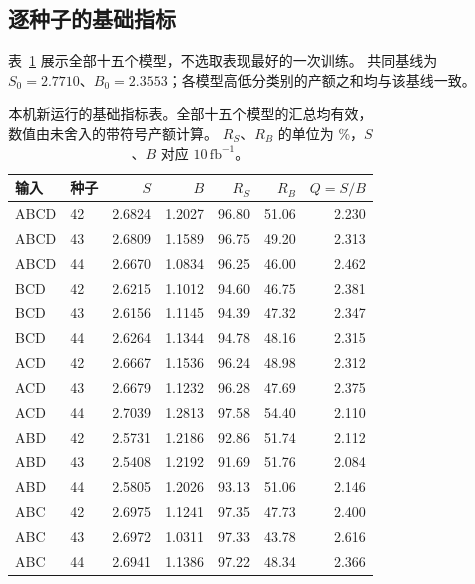 \documentclass[11pt,a4paper,fontset=fandol,scheme=plain]{ctexart}
\begin{document}
\subsection{逐种子的基础指标}
表~\ref{tab:basic-all} 展示全部十五个模型，不选取表现最好的一次训练。
共同基线为 $S_0=2.7710$、$B_0=2.3553$；各模型高低分类别的产额之和均与该基线一致。
\begin{table}[H]
\caption{本机新运行的基础指标表。全部十五个模型的汇总均有效，数值由未舍入的带符号产额计算。
$R_S$、$R_B$ 的单位为 \%，$S$、$B$ 对应 $10\,\mathrm{fb}^{-1}$。}
\label{tab:basic-all}
\centering\small
\begin{tabular}{llrrrrr}
\toprule
输入 & 种子 & $S$ & $B$ & $R_S$ & $R_B$ & $Q=S/B$ \\
\midrule
ABCD & 42 & 2.6824 & 1.2027 & 96.80 & 51.06 & 2.230 \\
ABCD & 43 & 2.6809 & 1.1589 & 96.75 & 49.20 & 2.313 \\
ABCD & 44 & 2.6670 & 1.0834 & 96.25 & 46.00 & 2.462 \\
\addlinespace
BCD & 42 & 2.6215 & 1.1012 & 94.60 & 46.75 & 2.381 \\
BCD & 43 & 2.6156 & 1.1145 & 94.39 & 47.32 & 2.347 \\
BCD & 44 & 2.6264 & 1.1344 & 94.78 & 48.16 & 2.315 \\
\addlinespace
ACD & 42 & 2.6667 & 1.1536 & 96.24 & 48.98 & 2.312 \\
ACD & 43 & 2.6679 & 1.1232 & 96.28 & 47.69 & 2.375 \\
ACD & 44 & 2.7039 & 1.2813 & 97.58 & 54.40 & 2.110 \\
\addlinespace
ABD & 42 & 2.5731 & 1.2186 & 92.86 & 51.74 & 2.112 \\
ABD & 43 & 2.5408 & 1.2192 & 91.69 & 51.76 & 2.084 \\
ABD & 44 & 2.5805 & 1.2026 & 93.13 & 51.06 & 2.146 \\
\addlinespace
ABC & 42 & 2.6975 & 1.1241 & 97.35 & 47.73 & 2.400 \\
ABC & 43 & 2.6972 & 1.0311 & 97.33 & 43.78 & 2.616 \\
ABC & 44 & 2.6941 & 1.1386 & 97.22 & 48.34 & 2.366 \\
\bottomrule
\end{tabular}
\end{table}
\end{document}
